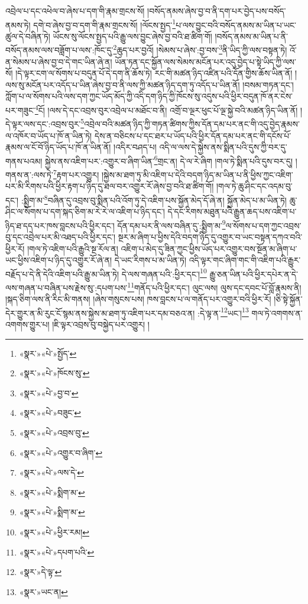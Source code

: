 འབྲེལ་པ་དང་འཕེལ་བ་ཞེས་པ་དག་གི་རྣམ་གྲངས་སོ། །བསོད་ནམས་ཞེས་བྱ་བ་ནི་དག་པར་བྱེད་པས་བསོད་ནམས་ཏེ། དགེ་བ་ཞེས་བྱ་བ་དག་གི་རྣམ་གྲངས་སོ། །ལོངས་སྤྱད་\footnote{«སྣར་»«པེ་»སྤྱོད་}པ་ལས་བྱུང་བའི་བསོད་ནམས་མ་ཡིན་པ་ཡང་ཚུལ་དེ་བཞིན་ཏེ། ཡོངས་སུ་ལོངས་སྤྱད་པའི་རྒྱུ་ལས་བྱུང་ཞེས་བྱ་བའི་ཐ་ཚིག་གོ། །བསོད་ནམས་མ་ཡིན་པ་ནི་བསོད་ནམས་ལས་བཟློག་པ་ལས་:ཁོང་དུ་\footnote{«སྣར་»«པེ་»ཁོངས་སུ་}ཆུད་པར་བྱའོ། །སེམས་པ་ཞེས་:བྱ་བས་\footnote{«སྣར་»«པེ་»བྱ་བ་}ནི་ཡིད་ཀྱི་ལས་བསྟན་ཏེ། འོ་ན་སེམས་པ་ཞེས་བྱ་བ་དེ་གང་ཡིན་ཞེ་ན། ཡོན་ཏན་དང་སྐྱོན་ལས་སེམས་མངོན་པར་འདུ་བྱེད་པ་སྟེ་ཡིད་ཀྱི་ལས་སོ། །དེ་ལྟར་ངག་ལ་སོགས་པ་བདུན་པོ་དེ་དག་ནི་ཆོས་ཏེ། རང་གི་མཚན་ཉིད་འཛིན་པའི་དོན་གྱིས་ཆོས་ཡིན་ནོ། །ལས་སུ་མངོན་པར་འདོད་པ་ཡིན་ཞེས་བྱ་བ་ནི་ལས་ཀྱི་མཚན་ཉིད་དག་ཏུ་འདོད་པ་ཡིན་ནོ། །བསམ་གཏན་དང་། ཀློག་པ་ལ་སོགས་པའི་ལས་དག་ཀྱང་ཡོད་མོད་ཀྱི་འདི་དག་ཉིད་ཀྱི་ཁོངས་སུ་འདུས་པའི་ཕྱིར་བདུན་ཁོ་ནར་ངེས་པར་གཟུང་\footnote{«སྣར་»«པེ་»བཟུང་}ངོ། །ལས་དེ་དང་འབྲས་བུར་འབྲེལ་པ་མཐོང་བ་ནི། འགྲོ་བ་ལྔར་ཕུང་པོ་ལྔ་སྐྱེ་བའི་མཚན་ཉིད་ཡིན་ནོ། །དེ་ལྟར་ལས་དང་:འབྲས་བུར་\footnote{«སྣར་»«པེ་»འབྲས་བུ་}འབྲེལ་བའི་མཚན་ཉིད་ཀྱི་གཏན་ཚིགས་ཀྱིས་དོན་དམ་པར་ནང་གི་འདུ་བྱེད་རྣམས་ལ་འཁོར་བ་ཡོད་པ་ཁོ་ན་ཡིན་ཏེ། དེས་ན་བཅིངས་པ་དང་ཐར་པ་ཡོད་པའི་ཕྱིར་དོན་དམ་པར་ནང་གི་དངོས་པོ་རྣམས་ལ་ངོ་བོ་ཉིད་ཡོད་པ་ཁོ་ན་ཡིན་ནོ། །འདིར་བཤད་པ། འདི་ལ་ལས་དེ་སྐྱེས་ནས་སྨིན་པའི་དུས་ཀྱི་བར་དུ་གནས་པའམ། སྐྱེས་ནས་འཇིག་པར་:འགྱུར་བ་ཞིག་ཡིན་\footnote{«སྣར་»«པེ་»འགྱུར་བ་ཞིག་}གྲང་ན། དེ་ལ་རེ་ཞིག །གལ་ཏེ་སྨིན་པའི་དུས་བར་དུ། །གནས་ན་:ལས་ཏེ་\footnote{«སྣར་»«པེ་»ལས་དེ་}རྟག་པར་འགྱུར། །སྐྱེས་མ་ཐག་ཏུ་མི་འཇིག་པ་དེའི་བདག་ཉིད་མ་ཡིན་པ་ནི་ཕྱིས་ཀྱང་འཇིག་པར་མི་རིགས་པའི་ཕྱིར་རྟག་པ་ཉིད་དུ་ཐལ་བར་འགྱུར་རོ་ཞེས་བྱ་བའི་ཐ་ཚིག་གོ། །གལ་ཏེ་ཆུ་ཤིང་དང་འདམ་བུ་དང་། :སྨྱིག་མ་\footnote{«སྣར་»«པེ་»སྨིག་མ་}བཞིན་དུ་འབྲས་བུ་སྨིན་པའི་འོག་ཏུ་དེ་འཇིག་པས་སྐྱོན་མེད་དོ་ཞེ་ན། སྐྱོན་མེད་པ་མ་ཡིན་ཏེ། ཆུ་ཤིང་ལ་སོགས་པ་དག་སྐད་ཅིག་མ་རེ་རེ་ལ་འཇིག་པ་ཉིད་དང་། དེ་དང་རིགས་མཐུན་པའི་རྒྱུན་ཆད་པས་འཇིག་པ་ཉིད་ཐ་དད་པར་ཁས་བླངས་པའི་ཕྱིར་དང་། དོན་དམ་པར་ནི་ལས་བཞིན་དུ་:སྨྱིག་མ་\footnote{«སྣར་»«པེ་»སྨིག་མ་}ལ་སོགས་པ་དག་ཀྱང་འབྲས་བུ་དང་འབྲེལ་པར་མི་འཐད་པའི་ཕྱིར་དང་། སྔར་མ་ཞིག་པ་ཕྱིས་དེའི་བདག་ཉིད་དུ་འགྱུར་བ་ཡང་བསྟན་དཀའ་བའི་ཕྱིར་རོ། །གལ་ཏེ་འཇིག་པའི་རྒྱུའི་སྔ་རོལ་ན། འཇིག་པ་མེད་དུ་ཟིན་ཀྱང་ཕྱིས་ཡོད་པར་འགྱུར་བས་སྔོན་མ་ཞིག་པ་ཡང་ཕྱིས་འཇིག་པ་ཉིད་དུ་འགྱུར་རོ་ཞེ་ན། དེ་ཡང་རིགས་པ་མ་ཡིན་ཏེ། འདི་ལྟར་གང་ཞིག་གང་གི་འཇིག་པའི་རྒྱུར་བརྗོད་པ་དེ་ནི་དེའི་འཇིག་པའི་རྒྱུ་མ་ཡིན་ཏེ། དེ་ལས་གཞན་པའི་:ཕྱིར་དང་།\footnote{«སྣར་»«པེ་»ཕྱིར་རམ།} རྒྱུ་ཅན་ཡིན་པའི་ཕྱིར་དཔེར་ན་དེ་ལས་གཞན་པ་བཞིན་པས་རྗེས་སུ་:དཔག་པས་\footnote{«སྣར་»«པེ་»དཔག་པའི་}གནོད་པའི་ཕྱིར་དང་། ལུང་ལས། ལུས་དང་དབང་པོ་བློ་རྣམས་ནི། །སྐད་ཅིག་ལས་ནི་རིང་མི་གནས། །ཞེས་གསུངས་པས། ཁས་བླངས་པ་ལ་གནོད་པར་འགྱུར་བའི་ཕྱིར་རོ། །ཅི་སྟེ་སྐྱོན་དེར་གྱུར་ན་མི་རུང་ངོ་སྙམ་ནས་སྐྱེས་མ་ཐག་ཏུ་འཇིག་པར་དམ་བཅའ་ན། :དེ་ལྟ་ན་\footnote{«སྣར་»དེ་ལྟ་}ཡང་།\footnote{«སྣར་»ཡང་ན།} གལ་ཏེ་འགགས་ན་འགགས་གྱུར་པ། །ཇི་ལྟར་འབྲས་བུ་བསྐྱེད་པར་འགྱུར། །
